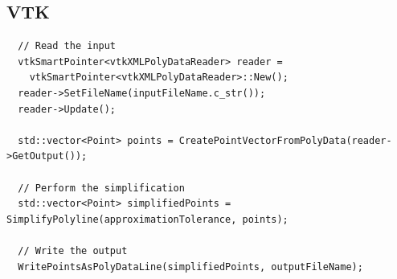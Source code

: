 \documentclass{InsightArticle}
\begin{document}
\subsection{VTK}
\begin{verbatim}
  // Read the input
  vtkSmartPointer<vtkXMLPolyDataReader> reader =
    vtkSmartPointer<vtkXMLPolyDataReader>::New();
  reader->SetFileName(inputFileName.c_str());
  reader->Update();
  
  std::vector<Point> points = CreatePointVectorFromPolyData(reader->GetOutput());
  
  // Perform the simplification
  std::vector<Point> simplifiedPoints = SimplifyPolyline(approximationTolerance, points);

  // Write the output
  WritePointsAsPolyDataLine(simplifiedPoints, outputFileName);

\end{verbatim}
\end{document}
